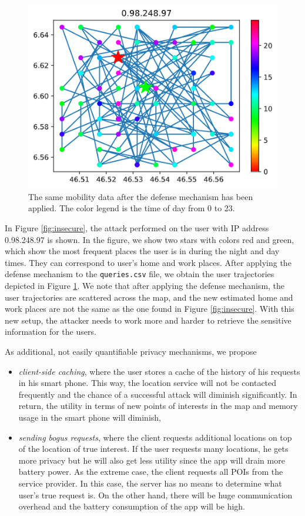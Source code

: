 \documentclass[9pt,conference]{IEEEtran}
\begin{document}
\begin{figure}
    \centering
    \includegraphics[width=0.5\linewidth]{images/0.98.248.87_secure.png}
    \caption{The same mobility data after the defense mechanism has been applied. The color legend is the time of day from 0 to 23.}
    \label{fig:secure}
\end{figure}

In Figure \ref{fig:insecure}, the attack performed on the user with IP address 0.98.248.97 is shown. In the figure, we show two stars with colors red and green, which show the most frequent places the user is in during the night and day times. They can correspond to user's home and work places. After applying the defense mechanism to the \texttt{queries.csv} file, we obtain the user trajectories depicted in Figure \ref{fig:secure}. We note that after applying the defense mechanism, the user trajectories are scattered across the map, and the new estimated home and work places are not the same as the one found in Figure \ref{fig:insecure}. With this new setup, the attacker needs to work more and harder to retrieve the sensitive information for the users.

As additional, not easily quantifiable privacy mechanisms, we propose

\begin{itemize}
    \item \textit{client-side caching}, where the user stores a cache of the history of his requests in his smart phone. This way, the location service will not be contacted frequently and the chance of a successful attack will diminish significantly. In return, the utility in terms of new points of interests in the map and memory usage in the smart phone will diminish,
    \item \textit{sending bogus requests}, where the client requests additional locations on top of the location of true interest. If the user requests many locations, he gets more privacy but he will also get less utility since the app will drain more battery power. As the extreme case, the client requests all POIs from the service provider. In this case, the server has no means to determine what user's true request is. On the other hand, there will be huge communication overhead and the battery consumption of the app will be high.
\end{itemize}
\end{document}

